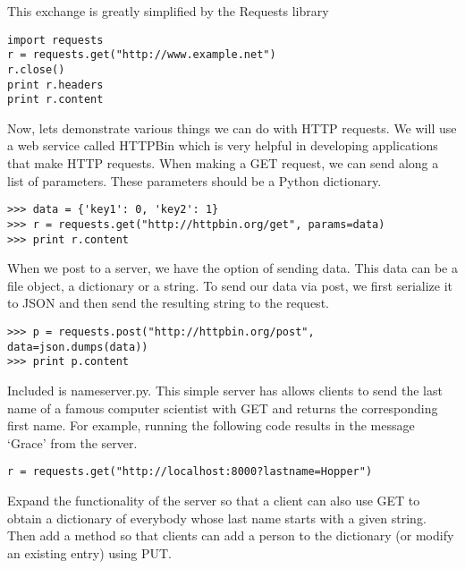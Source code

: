 This exchange is greatly simplified by the Requests library
\begin{lstlisting}
import requests
r = requests.get("http://www.example.net")
r.close()
print r.headers
print r.content
\end{lstlisting}

Now, lets demonstrate various things we can do with HTTP requests.
We will use a web service called HTTPBin which is very helpful in developing applications that make HTTP requests.
When making a GET request, we can send along a list of parameters.
These parameters should be a Python dictionary.
\begin{lstlisting}
>>> data = {'key1': 0, 'key2': 1}
>>> r = requests.get("http://httpbin.org/get", params=data)
>>> print r.content
\end{lstlisting}

When we post to a server, we have the option of sending data.
This data can be a file object, a dictionary or a string.
To send our data via post, we first serialize it to JSON and then send the resulting string to the request.
\begin{lstlisting}
>>> p = requests.post("http://httpbin.org/post", data=json.dumps(data))
>>> print p.content
\end{lstlisting}

\begin{problem}
Included is nameserver.py. This simple server has allows clients to send the last name of a famous computer scientist with GET and returns the corresponding first name. For example, running the following code results in the message `Grace' from the server.

\begin{lstlisting}
r = requests.get("http://localhost:8000?lastname=Hopper")
\end{lstlisting}

Expand the functionality of the server so that a client can also use GET to obtain a dictionary of everybody whose last name starts with a given string. Then add a method so that clients can add a person to the dictionary (or modify an existing entry) using PUT.
\end{problem}
